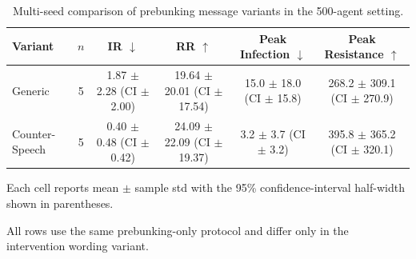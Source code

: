 \begin{table}[t]
\centering
\small
\caption{Multi-seed comparison of prebunking message variants in the 500-agent setting.}
\label{tab:prebunking_variant_macro_results}
\begin{threeparttable}
\begin{tabular}{lccccc}
\toprule
Variant & $n$ & IR $\downarrow$ & RR $\uparrow$ & Peak Infection $\downarrow$ & Peak Resistance $\uparrow$ \\
\midrule
Generic & 5 & 1.87 $\pm$ 2.28 (CI $\pm$ 2.00) & 19.64 $\pm$ 20.01 (CI $\pm$ 17.54) & 15.0 $\pm$ 18.0 (CI $\pm$ 15.8) & 268.2 $\pm$ 309.1 (CI $\pm$ 270.9) \\
Counter-Speech & 5 & 0.40 $\pm$ 0.48 (CI $\pm$ 0.42) & 24.09 $\pm$ 22.09 (CI $\pm$ 19.37) & 3.2 $\pm$ 3.7 (CI $\pm$ 3.2) & 395.8 $\pm$ 365.2 (CI $\pm$ 320.1) \\
\bottomrule
\end{tabular}
\begin{tablenotes}[flushleft]
\footnotesize
\item Each cell reports mean $\pm$ sample std with the 95\% confidence-interval half-width shown in parentheses.
\item All rows use the same prebunking-only protocol and differ only in the intervention wording variant.
\end{tablenotes}
\end{threeparttable}
\end{table}
